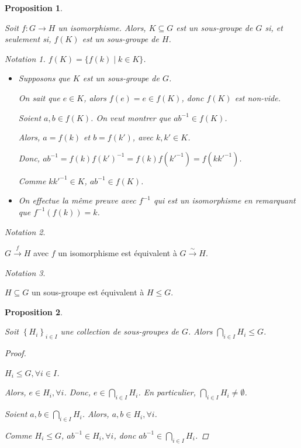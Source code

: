 \documentclass{report}
\newcommand*{\lte}{\leqslant}
\newtheorem*{prop}{Proposition}
\theoremstyle{definition}
\theoremstyle{remark}
\newtheorem*{nota}{Notation}
\begin{document}
	\begin{prop}~

		Soit $f:G \to H$ un isomorphisme. Alors, $K \subseteq G$ est un sous-groupe de $G$ si, et seulement si, $f(K)$ est un sous-groupe de $H$.
		\begin{nota}
			$f(K) = \{f(k) \mid k \in K\}$.
		\end{nota}

		\begin{itemize}
			\item[$(\Rightarrow)$] Supposons que $K$ est un sous-groupe de $G$.

			On sait que $e \in K$, alors $f(e)=e \in f(K)$, donc $f(K)$ est non-vide.

			Soient $a,b \in f(K)$. On veut montrer que $ab^{-1} \in f(K)$.

			Alors, $a=f(k)$ et $b=f(k')$, avec $k,k' \in K$.

			Donc, $ab^{-1} = f(k)f(k')^{-1} = f(k)f(k'^{-1}) = f(kk'^{-1})$.

			Comme $kk'^{-1} \in K$, $ab^{-1} \in f(K)$.
			\item[$(\Leftarrow)$] On effectue la m\^eme preuve avec $f^{-1}$ qui est un isomorphisme en remarquant que $f^{-1}(f(k))=k$.
		\end{itemize}
	\end{prop}
	\begin{nota}
		~

		$G\xrightarrow{f}H$ avec $f$ un isomorphisme est \'equivalent \`a $G\xrightarrow{\sim}H$.
	\end{nota}
	\begin{nota}
		~

		$H \subseteq G$ un sous-groupe est \'equivalent \`a $H \lte G$.
	\end{nota}
	\begin{prop}
		~

		Soit $\left\lbrace H_i \right\rbrace_{i \in I}$ une collection de sous-groupes de $G$. Alors $\bigcap\limits_{i \in I}H_i \lte G$.
		\begin{proof}~

			$H_i \lte G, \forall i \in I$.

			Alors, $e \in H_i, \forall i$. Donc, $e \in \bigcap\limits_{i \in I}H_i$. En particulier, $\bigcap\limits_{i \in I}H_i \neq \emptyset$.

			Soient $a,b\in \bigcap\limits_{i \in I}H_i$. Alors, $a,b \in H_i, \forall i$.

			Comme $H_i \lte G$, $ab^{-1} \in H_i, \forall i$, donc $ab^{-1} \in \bigcap\limits_{i \in I}H_i$.
		\end{proof}
	\end{prop}
\end{document}
